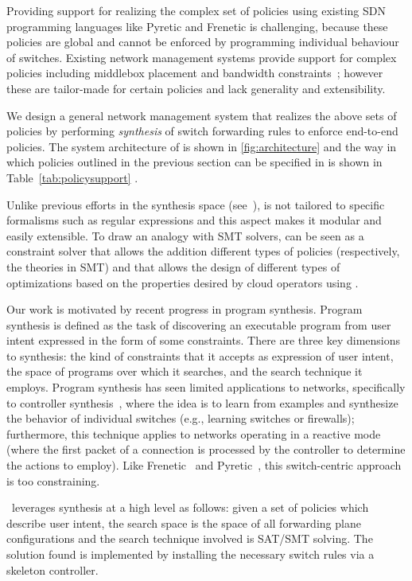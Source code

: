 


Providing support for realizing the complex set of policies using
existing SDN programming languages like Pyretic and Frenetic is
challenging, because these policies are global and cannot be enforced
by programming individual behaviour of switches. Existing network
management systems provide support for complex policies including
middlebox placement and bandwidth constraints~\cite{}; however these
are tailor-made for certain policies and lack generality and
extensibility.

We design a general network management system that realizes the above
sets of policies by performing {\em synthesis} of switch forwarding
rules to enforce end-to-end policies. The system architecture of \name
is shown in \cref{fig:architecture} and the way in which policies
outlined in the previous section can be specified in \name is shown in
Table~\ref{tab:policysupport} .

Unlike previous efforts in the synthesis space (see~\cite{netgen, Merlin}), \Name is
not tailored to specific formalisms such as regular expressions and
this aspect makes it modular and easily extensible.
To draw an analogy with SMT solvers, \Name can be seen as a constraint
solver that allows the addition different types of policies
(respectively, the theories in SMT) and that allows the design of
different types of optimizations based on the properties desired by cloud
  operators using \Name. 
  
Our work is motivated by recent progress in program synthesis.
Program synthesis is defined as the task of discovering an executable
program from user intent expressed in the form of some
constraints. There are three key dimensions to synthesis: the kind of
constraints that it accepts as expression of user intent, the space of
programs over which it searches, and the search technique it
employs. Program synthesis has seen limited applications to networks,
specifically to controller synthesis~\cite{netegg}, where the idea is
to learn from examples and synthesize the behavior of individual
switches (e.g., learning switches or firewalls); furthermore, this
technique applies to networks operating in a reactive mode (where the
first packet of a connection is processed by the controller to
determine the actions to employ). Like Frenetic~\cite{} and
Pyretic~\cite{}, this switch-centric approach is too constraining.

\Name\ leverages synthesis at a high level as follows: given a set of
policies which describe user intent, the search space is the space of
all forwarding plane configurations and the search technique involved
is SAT/SMT solving. The solution found is implemented by installing
the necessary switch rules via a skeleton controller.

